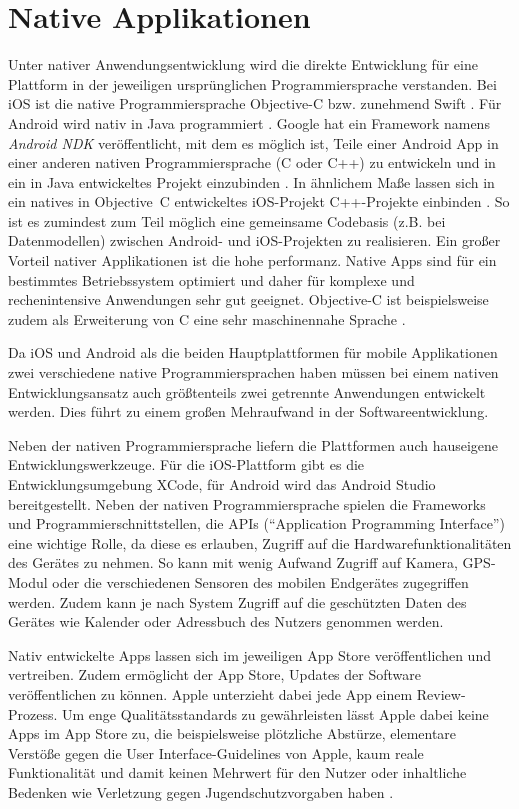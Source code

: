 \section{Native Applikationen}
\label{sec:nativeApplikationen}
%
Unter nativer Anwendungsentwicklung wird die direkte Entwicklung für eine Plattform in der jeweiligen ursprünglichen Programmiersprache verstanden. Bei iOS ist die native Programmiersprache Objective-C bzw. zunehmend Swift \cite{appleDokuSwift}. Für Android wird nativ in Java programmiert \cite{googleAndroidDoku}. Google hat ein Framework namens \emph{Android NDK} veröffentlicht, mit dem es möglich ist, Teile einer Android App in einer anderen nativen Programmiersprache (C oder C++) zu entwickeln und in ein in Java entwickeltes Projekt einzubinden \cite{googleAndroidNDKDoku}. In ähnlichem Maße lassen sich in ein natives in Objective~C entwickeltes iOS-Projekt C++-Projekte einbinden \cite{appleDokuCppObjectiveC}. So ist es zumindest zum Teil möglich eine gemeinsame Codebasis (z.B. bei Datenmodellen) zwischen Android- und iOS-Projekten zu realisieren.
Ein großer Vorteil nativer Applikationen ist die hohe performanz. Native Apps sind für ein bestimmtes Betriebssystem optimiert und daher für komplexe und rechenintensive Anwendungen sehr gut geeignet. Objective-C ist beispielsweise zudem als Erweiterung von C eine sehr maschinennahe Sprache \cite{appleObjectiveC}. 

Da iOS und Android als die beiden Hauptplattformen für mobile Applikationen zwei verschiedene native Programmiersprachen haben müssen bei einem nativen Entwicklungsansatz auch größtenteils zwei getrennte Anwendungen entwickelt werden. Dies führt zu einem großen Mehraufwand in der Softwareentwicklung.

Neben der nativen Programmiersprache liefern die Plattformen auch hauseigene Entwicklungswerkzeuge. Für die iOS-Plattform gibt es die Entwicklungsumgebung XCode, für Android wird das Android Studio bereitgestellt. Neben der nativen Programmiersprache spielen die Frameworks und Programmierschnittstellen, die APIs (\enquote{Application Programming Interface}) eine wichtige Rolle, da diese es erlauben, Zugriff auf die Hardwarefunktionalitäten des Gerätes zu nehmen. So kann mit wenig Aufwand Zugriff auf Kamera, GPS-Modul oder die verschiedenen Sensoren des mobilen Endgerätes zugegriffen werden. Zudem kann je nach System Zugriff auf die geschützten Daten des Gerätes wie Kalender oder Adressbuch des Nutzers genommen werden. 

Nativ entwickelte Apps lassen sich im jeweiligen App Store veröffentlichen und vertreiben. Zudem ermöglicht der App Store, Updates der Software veröffentlichen zu können. Apple unterzieht dabei jede App einem Review-Prozess. Um enge Qualitätsstandards zu gewährleisten lässt Apple dabei keine Apps im App Store zu, die beispielsweise plötzliche Abstürze, elementare Verstöße gegen die User Interface-Guidelines von Apple, kaum reale Funktionalität und damit keinen Mehrwert für den Nutzer oder inhaltliche Bedenken wie Verletzung gegen Jugendschutzvorgaben haben \cite{appleReview}.
%
